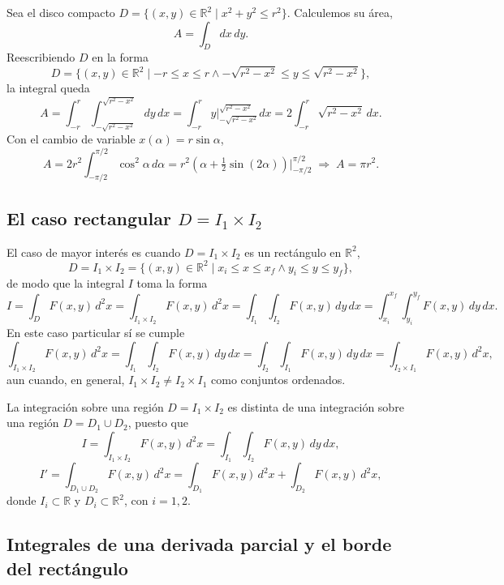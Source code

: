 \begin{ejemplo}
Sea el disco compacto $D = \{(x,y)\in\mathbb{R}^2 \mid x^2+y^2\le r^2\}$.
Calculemos su área,
\[
A = \int_D dx\,dy .
\]
Reescribiendo $D$ en la forma
\[
D = \{(x,y)\in\mathbb{R}^2 \mid -r\le x\le r \wedge -\sqrt{r^2-x^2}\le y \le
\sqrt{r^2-x^2}\},
\]
la integral queda
\[
A = \int_{-r}^{r} \int_{-\sqrt{r^2-x^2}}^{\sqrt{r^2-x^2}} dy\,dx
= \int_{-r}^{r} y \Big|_{-\sqrt{r^2-x^2}}^{\sqrt{r^2-x^2}} dx
= 2\int_{-r}^{r} \sqrt{r^2-x^2}\, dx .
\]
Con el cambio de variable $x(\alpha) = r\sin\alpha$,
\[
A = 2r^2 \int_{-\pi/2}^{\pi/2} \cos^2\alpha\, d\alpha
= r^2 \left(\alpha + \tfrac12\sin(2\alpha)\right)\Big|_{-\pi/2}^{\pi/2}
\;\Longrightarrow\; A = \pi r^2 .
\]
\end{ejemplo}

\subsection{El caso rectangular \texorpdfstring{$D=I_1\times I_2$}{D=I1xI2}}

El caso de mayor interés es cuando $D = I_1\times I_2$ es un rectángulo en
$\mathbb{R}^2$,
\[
D = I_1\times I_2 = \{(x,y)\in\mathbb{R}^2 \mid x_i\le x\le x_f \wedge
y_i\le y\le y_f\},
\]
de modo que la integral $I$ toma la forma
\[
I = \int_D F(x,y)\, d^2x = \int_{I_1\times I_2} F(x,y)\, d^2x
= \int_{I_1}\int_{I_2} F(x,y)\, dy\, dx
= \int_{x_i}^{x_f}\int_{y_i}^{y_f} F(x,y)\,dy\,dx .
\]
En este caso particular sí se cumple
\[
\int_{I_1\times I_2} F(x,y)\, d^2x = \int_{I_1}\int_{I_2} F(x,y)\,dy\,dx
= \int_{I_2}\int_{I_1} F(x,y)\,dy\,dx = \int_{I_2\times I_1} F(x,y)\, d^2x ,
\]
aun cuando, en general, $I_1\times I_2 \neq I_2\times I_1$ como conjuntos
ordenados.

\begin{observacion}
La integración sobre una región $D=I_1\times I_2$ es distinta de una
integración sobre una región $D = D_1 \cup D_2$, puesto que
\[
I = \int_{I_1\times I_2} F(x,y)\, d^2x = \int_{I_1}\int_{I_2} F(x,y)\,dy\,dx,
\]
\[
I' = \int_{D_1\cup D_2} F(x,y)\, d^2x = \int_{D_1} F(x,y)\,d^2x +
\int_{D_2} F(x,y)\, d^2x,
\]
donde $I_i\subset\mathbb{R}$ y $D_i\subset\mathbb{R}^2$, con $i=1,2$.
\end{observacion}

\subsection{Integrales de una derivada parcial y el borde del rectángulo}

